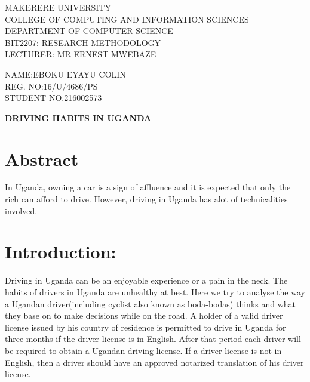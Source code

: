 \documentclass{article}                    %
\begin{document}
\begin{titlepage} %

	\centering %
	
	\scshape %
	
	\vspace*{\baselineskip} %
	
	
		
	\vspace{0.80\baselineskip} %
	
	{\LARGE MAKERERE UNIVERSITY\\ COLLEGE OF COMPUTING AND INFORMATION SCIENCES\\ DEPARTMENT OF COMPUTER SCIENCE\\BIT2207: RESEARCH METHODOLOGY\\LECTURER: MR ERNEST MWEBAZE\\} %
	
	\vspace{8.00\baselineskip} %
	

	
	
	\vspace{0.5\baselineskip} %
	
	{\scshape\Large NAME:EBOKU EYAYU COLIN\\REG. NO:16/U/4686/PS\\STUDENT NO.216002573 \\} %
	
	\vspace{0.5\baselineskip} %
\end{titlepage}
\newpage
{\textbf{DRIVING HABITS IN UGANDA}}
\section{Abstract}
In Uganda, owning a car is a sign of affluence and it is expected that only the rich can afford to drive. However, driving in Uganda has alot of technicalities involved.
\section{Introduction:  }
Driving in Uganda can be an enjoyable experience or a pain in the neck. The habits of drivers in Uganda are unhealthy at best. Here we try to analyse the way a Ugandan driver(including cyclist also known as boda-bodas) thinks and what they base on to make decisions while on the road. 
A holder of a valid driver license issued by his country of residence is permitted to drive in Uganda for three months if the driver license is in English. After that period each driver will be required to obtain a Ugandan driving license. If a driver license is not in English, then a driver should have an approved notarized translation of his driver license.
\end{document}
